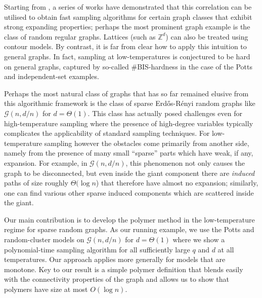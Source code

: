\documentclass[11pt]{article}
\theoremstyle{plain}
\newcommand{\G}{\mathcal{G}}
\newcommand{\1}{\mathbb{1}}
\begin{document}
Starting from \cite{helmuth2019algorithmic, doi:10.1137/19M1286669}, a series of works have demonstrated that 
 this correlation can be utilised  to  obtain fast sampling algorithms for certain graph classes that exhibit strong expanding properties; perhaps the most prominent graph example is the class of  random regular graphs.
 Lattices   (such as $\mathbb{Z}^d$) can also be treated using contour models. By contrast, 
it is far from clear how to apply this intuition to general graphs. In fact,  sampling at low-temperatures is conjectured to be hard on general graphs, captured by so-called \#BIS-hardness in the case of the Potts and independent-set examples. 

Perhaps the most natural class of graphs that  has so far remained elusive from this algorithmic framework is the class of sparse Erd\H{o}s-R\'enyi random graphs like $\G(n,d/n)$ for $d=\Theta(1)$. This class has actually posed challenges even for high-temperature sampling \cite{Kuikui,efthymiou, DBLP:conf/approx/BlancaZ23, bezakova, efthymiou_colorings, yin_zhang, MosselSly} where the presence of high-degree variables typically complicates the applicability of standard sampling  techniques. For low-temperature sampling however the obstacles come primarily from another side, namely from the presence of many small ``sparse'' parts which have weak, if any, expansion.  For example, in $\G(n,d/n)$, this phenomenon not only causes the graph to be disconnected, but even inside the giant component there are \emph{induced} paths of size roughly $\Theta(\log n$) that therefore have almost no expansion; similarly, one can find various other sparse induced components which are scattered inside the giant. 

Our main contribution is to develop the polymer method in the low-temperature regime for sparse random graphs. As our running example, we use the Potts and random-cluster models on $\G(n,d/n)$ for $d=\Theta(1)$ where we show a polynomial-time sampling algorithm for all sufficiently large $q$ and $d$ at all temperatures. Our approach applies more generally for models that are monotone. Key to our result is a simple polymer definition that blends easily with the connectivity properties of the graph and allows us to show that polymers have size at most $O(\log n)$.
\end{document}
